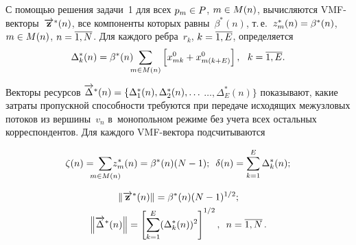 \begin{multicols}{2}
\begin{figure*}[b] %
      \begin{center}
     \mbox{%
\epsfxsize=153.408mm 
}
\end{center}
\vspace*{-9pt}
\vspace*{12pt}
      \begin{center}
     \mbox{%
\epsfxsize=163mm 
}
\end{center}
\vspace*{-9pt}
\end{figure*}

\vspace*{-2pt}

С помощью решения задачи~1 для всех $p_m \hm\in P$, $m \hm\in M(n)$, вычисляются VMF-век\-то\-ры~$\overrightarrow{\mathbf{z}}^*(n)$, 
все компоненты которых равны~$\beta^*(n)$, 
т.\,е.\ $z_m^*(n) \hm= \beta^*(n)$, $m \hm\in M(n)$,  $n \hm=\ol{1, N}$. Для каждого ребра~$r_k$, $k \hm=\ol{1, E}$, определяется
$$ 
\Delta_k^*(n) =  \beta^*(n)\!\!\! \sum\limits_{m \in M(n)} \left[ x_{mk}^0+  x_{m(k+E)}^0\right], \ \  
k =\overline{1, E}.
$$

\vspace*{-3pt}

\noindent
Векторы ресурсов $\ora\Delta^*(n) \hm= \{\Delta_1^*(n), \Delta_2^*(n), \ldots\linebreak$ $\ldots ,
\Delta_E^*(n)\}$ показывают, какие затраты пропускной способности требуются при 
передаче исходящих межузловых потоков из вершины~$v_n$ в~монопольном режиме без 
учета всех остальных корреспондентов. Для каждого VMF-век\-то\-ра подсчитываются

\noindent
\begin{equation*}
\zeta(n) = \!\!\!\!\sum\limits_{m \in M(n)}\!\! \!\!\!\!z_m^*(n) = \beta^*(n) (N - 1);\enskip
\delta(n) 
=\sum\limits_{k = 1}^E \Delta_k^{*}(n);
\end{equation*}

\vspace*{-12pt}

\noindent
\begin{multline*}
\left\|\overrightarrow{\mathbf{z}}^{*}(n)\right\| = \beta^*(n)(N - 1)^{1/2}; \\
\left\|\overrightarrow\Delta^{*}(n)\right\|  = \left[\sum\limits_{k = 1}^E (\Delta_k^*(n))^2\right]^{1/2}, \enskip n =\overline{1, N}\,.
\end{multline*}


\end{multicols}
